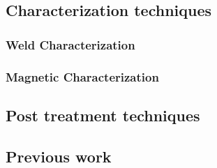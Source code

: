 \subsection{Characterization techniques}

\subsubsection{Weld Characterization}



\subsubsection{Magnetic Characterization}

\subsection{Post treatment techniques}

\subsection{Previous work}



